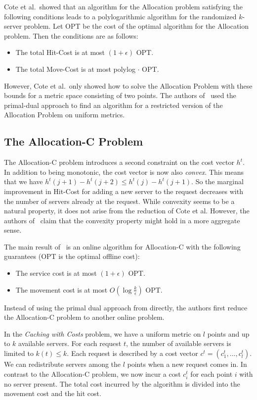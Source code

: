 Cote et al.\ showed that an algorithm for the Allocation problem satisfying the following conditions leads to a polylogarithmic algorithm for the randomized $k$-server problem.
Let OPT be the cost of the optimal algorithm for the Allocation problem.
Then the conditions are as follows:
\begin{itemize}
\item The total Hit-Cost is at most $(1 + \epsilon)$ OPT.
\item The total Move-Cost is at most polylog $\cdot$ OPT.
\end{itemize}
However, Cote et al.\ only showed how to solve the Allocation Problem with these bounds for a metric space consisting of two points.
The authors of~\cite{bansal10:k-server} used the primal-dual approach to find an algorithm for a restricted version of the Allocation Problem on uniform metrics.

\subsection{The Allocation-C Problem}
The Allocation-C problem introduces a second constraint on the cost vector $h^t$.
In addition to being monotonic, the cost vector is now also \emph{convex}.
This means that we have $h^t(j+1) - h^t(j +2) \leq h^t(j) - h^t(j + 1)$.
So the marginal improvement in Hit-Cost for adding a new server to the request decreases with the number of servers already at the request.
While convexity seems to be a natural property, it does not arise from the reduction of Cote et al.
However, the authors of~\cite{bansal10:k-server} claim that the convexity property might hold in a more aggregate sense.

The main result of~\cite{bansal10:k-server} is an online algorithm for Allocation-C with the following guarantees (OPT is the optimal offline cost):
\begin{itemize}
\item The service cost is at most $(1+\epsilon)$ OPT.
\item The movement cost is at most $O(\log\frac{k}{\epsilon})$ OPT.
\end{itemize}

Instead of using the primal dual approach from \cite{buchbinder09:survey} directly, the authors first reduce the Allocation-C problem to another online problem.

In the \emph{Caching with Costs} problem, we have a uniform metric on $l$ points and up to $k$ available servers.
For each request $t$, the number of available servers is limited to $k(t) \leq k$.
Each request is described by a cost vector $c^t = (c_1^t, \ldots, c^t_l)$.
We can redistribute servers among the $l$ points when a new request comes in.
In contrast to the Allocation-C problem, we now incur a cost $c_i^t$ for each point $i$ with no server present.
The total cost incurred by the algorithm is divided into the movement cost and the hit cost.

